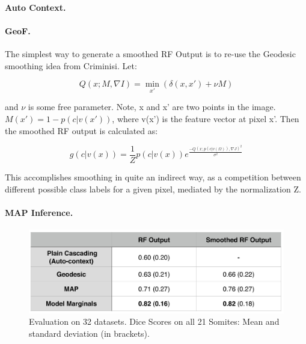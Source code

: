 \documentclass[10pt,twocolumn,letterpaper]{article}
\begin{document}
\paragraph{Auto Context. }

\paragraph{GeoF. }
The simplest way to generate a smoothed RF Output is to re-use the Geodesic smoothing idea from Criminisi.  Let:

\[ Q(x; M, \nabla I) = \min_{x'} (\delta (x,x') + \nu M) \]

and $\nu$ is some free parameter.  Note, x and x' are two points in the image. $M(x') = 1 - p(c|v(x'))$, where v(x') is the feature vector at pixel x'.  Then the smoothed RF output is calculated as:

\[ g(c|v(x)) = \frac{1}{Z} p(c|v(x)) e^{\frac{-Q(x;p(c|v(\Omega)),\nabla J)^2}{\sigma ^2}} \]

This accomplishes smoothing in quite an indirect way, as a competition between different possible class labels for a given pixel, mediated by the normalization Z.  

\paragraph{MAP Inference. }

\begin{figure}[t]
\begin{center}
\includegraphics[width=\columnwidth]{TableDiceScores_2columns_noGeoF2.jpg} %
\caption{Evaluation on 32 datasets. Dice Scores on all 21 Somites: Mean and standard deviation (in brackets).}
\label{tab:results}
\end{center}
\end{figure}
\end{document}
